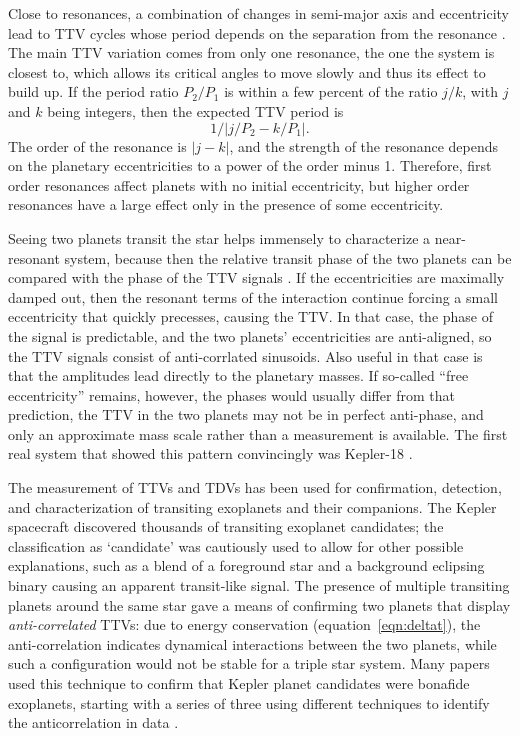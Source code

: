 \documentclass[graybox,natbib,nosecnum]{svmult}
\begin{document}
Close to resonances, a combination of changes in semi-major axis and eccentricity lead to TTV cycles whose period depends on the separation from the resonance \citep{2012ApJ...761..122L}.  The main TTV variation comes from only one resonance, the one the system is closest to, which allows its critical angles to move slowly and thus its effect to build up.  If the period ratio $P_2/P_1$ is within a few percent of the ratio $j/k$, with $j$ and $k$ being integers, then the expected TTV period is 
\begin{equation}
1/|j/P_2-k/P_1|. \label{eqn:pttv}
\end{equation}
The order of the resonance is $|j-k|$, and the strength of the resonance depends on the planetary eccentricities to a power of the order minus 1.  Therefore, first order resonances affect planets with no initial eccentricity, but higher order resonances have a large effect only in the presence of some eccentricity. 

Seeing two planets transit the star helps immensely to characterize a near-resonant system, because then the relative transit phase of the two planets can be compared with the phase of the TTV signals \citep{2012ApJ...761..122L}.  If the eccentricities are maximally damped out, then the resonant terms of the interaction continue forcing a small eccentricity that quickly precesses, causing the TTV.  In that case, the phase of the signal is predictable, and the two planets' eccentricities are anti-aligned, so the TTV signals consist of anti-corrlated sinusoids.  Also useful in that case is that the amplitudes lead directly to the planetary masses.  If so-called ``free eccentricity'' remains, however, the phases would usually differ from that prediction, the TTV in the two planets may not be in perfect anti-phase, and only an approximate mass scale rather than a measurement is available.  The first real system that showed this pattern convincingly was Kepler-18 \citep{2011ApJS..197....7C}. %

The measurement of TTVs and TDVs has been used for confirmation, detection, and characterization of
transiting exoplanets and their companions.  The Kepler spacecraft discovered thousands of transiting
exoplanet candidates;  the classification as `candidate' was cautiously used to allow for other
possible explanations, such as a blend of a foreground star and a background eclipsing binary causing
an apparent transit-like signal.  The presence of multiple transiting planets around the same star
gave a means of confirming two planets that display {\em anti-correlated} TTVs: due to energy conservation (equation~\ref{eqn:deltat}), the anti-correlation indicates dynamical interactions between the
two planets, while such a configuration would not be stable for a triple star system.  Many papers 
used this technique to confirm that Kepler planet candidates were bonafide exoplanets, starting with a series of three using different techniques to identify the anticorrelation in data \citet{2011ApJS..197....2F, 2012ApJ...750..113F, 2012ApJ...750..114F}.
\end{document}

